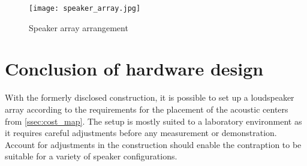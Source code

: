 \begin{figure}[H]
	\centering
    \texttt{[image: speaker\_array.jpg]}
    \caption{Speaker array arrangement}
    \label{fig:array_pic}
\end{figure}
\section{Conclusion of hardware design}
With the formerly disclosed construction, it is possible to set up a loudspeaker array according to the requirements for the placement of the acoustic centers from \autoref{ssec:cost_map}. The setup is mostly suited to a laboratory environment as it requires careful adjustments before any measurement or demonstration. Account for adjustments in the construction should enable the contraption to be suitable for a variety of speaker configurations.




